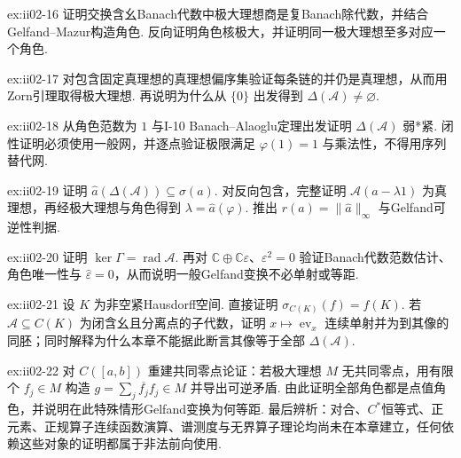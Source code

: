 \begin{FAExercise}[角色与极大理想]{ex:ii02-16}
证明交换含幺Banach代数中极大理想商是复Banach除代数，并结合Gelfand--Mazur构造角色. 反向证明角色核极大，并证明同一极大理想至多对应一个角色.
\end{FAExercise}

\begin{FAExercise}[Zorn与角色空间非空]{ex:ii02-17}
对包含固定真理想的真理想偏序集验证每条链的并仍是真理想，从而用Zorn引理取得极大理想. 再说明为什么从 \(\displaystyle\{0\}\) 出发得到 \(\displaystyle\Delta(\mathcal A)\neq\varnothing\).
\end{FAExercise}

\begin{FAExercise}[弱*紧角色空间]{ex:ii02-18}
从角色范数为 \(\displaystyle1\) 与I-10 Banach--Alaoglu定理出发证明 \(\displaystyle\Delta(\mathcal A)\) 弱*紧. 闭性证明必须使用一般网，并逐点验证极限满足 \(\displaystyle\varphi(1)=1\) 与乘法性，不得用序列替代网.
\end{FAExercise}

\begin{FAExercise}[Gelfand谱识别与可逆性]{ex:ii02-19}
证明 \(\displaystyle\widehat a(\Delta(\mathcal A))\subseteq\sigma(a)\). 对反向包含，完整证明 \(\displaystyle\mathcal A(a-\lambda1)\) 为真理想，再经极大理想与角色得到 \(\displaystyle\lambda=\widehat a(\varphi)\). 推出 \(\displaystyle r(a)=\|\widehat a\|_\infty\) 与Gelfand可逆性判据.
\end{FAExercise}

\begin{FAExercise}[根与双数反例]{ex:ii02-20}
证明 \(\displaystyle\ker\Gamma=\operatorname{rad}\mathcal A\). 再对 \(\displaystyle\mathbb C\oplus\mathbb C\varepsilon\)、\(\displaystyle\varepsilon^2=0\) 验证Banach代数范数估计、角色唯一性与 \(\displaystyle\widehat\varepsilon=0\)，从而说明一般Gelfand变换不必单射或等距.
\end{FAExercise}

\begin{FAExercise}{ex:ii02-21}
设 \(\displaystyle K\) 为非空紧Hausdorff空间. 直接证明 \(\displaystyle\sigma_{C(K)}(f)=f(K)\). 若 \(\displaystyle\mathcal A\subseteq C(K)\) 为闭含幺且分离点的子代数，证明 \(\displaystyle x\mapsto\operatorname{ev}_x\) 连续单射并为到其像的同胚；同时解释为什么本章不能据此断言其像等于全部 \(\displaystyle\Delta(\mathcal A)\).
\end{FAExercise}

\begin{FAExercise}[区间极大理想与II-03边界]{ex:ii02-22}
对 \(\displaystyle C([a,b])\) 重建共同零点论证：若极大理想 \(\displaystyle M\) 无共同零点，用有限个 \(\displaystyle f_j\in M\) 构造 \(\displaystyle g=\sum_j\overline{f_j}f_j\in M\) 并导出可逆矛盾. 由此证明全部角色都是点值角色，并说明在此特殊情形Gelfand变换为何等距. 最后辨析：对合、\(\displaystyle C^*\)恒等式、正元素、正规算子连续函数演算、谱测度与无界算子理论均尚未在本章建立，任何依赖这些对象的证明都属于非法前向使用.
\end{FAExercise}
